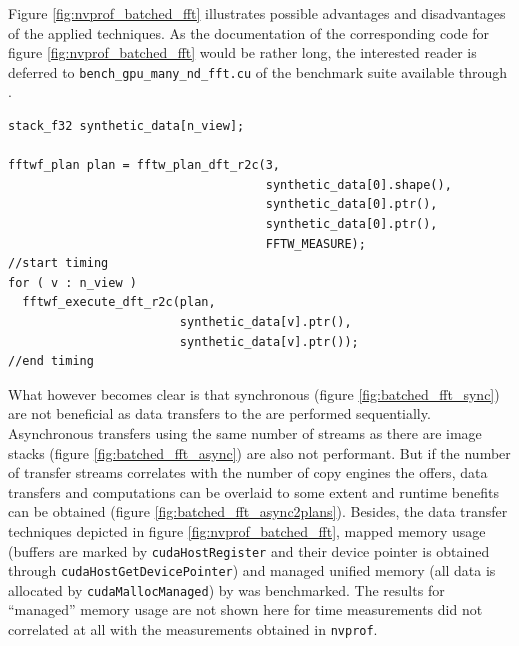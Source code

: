 Figure \ref{fig:nvprof_batched_fft} illustrates possible advantages and disadvantages of the applied techniques. As the documentation of the corresponding code for figure \ref{fig:nvprof_batched_fft} would be rather long, the interested reader is deferred to \texttt{bench\_gpu\_many\_nd\_fft.cu} of the \lmvn{} benchmark suite available through \cite{lmvn_repo}. 

\begin{lstlisting}[caption={Asynchronous Batched FFT on synthetic data performed on GPU in pseudo-code based on the \cufft{} syntax.},label={lst:batched_fft_gpu_async2plans}]
stack_f32 synthetic_data[n_view];

fftwf_plan plan = fftw_plan_dft_r2c(3,
                                    synthetic_data[0].shape(),
                                    synthetic_data[0].ptr(),
                                    synthetic_data[0].ptr(),
                                    FFTW_MEASURE);
//start timing
for ( v : n_view )
  fftwf_execute_dft_r2c(plan, 
                        synthetic_data[v].ptr(),
                        synthetic_data[v].ptr());
//end timing
\end{lstlisting}


What however becomes clear is that synchronous (figure \ref{fig:batched_fft_sync}) are not beneficial as data transfers to the \gpu{} are performed sequentially. Asynchronous transfers using the same number of streams as there are image stacks (figure \ref{fig:batched_fft_async}) are also not performant. But if the number of transfer streams correlates with the number of copy engines the \gpu{} offers, data transfers and computations can be overlaid to some extent and runtime benefits can be obtained (figure \ref{fig:batched_fft_async2plans}). Besides, the data transfer techniques depicted in figure \ref{fig:nvprof_batched_fft}, mapped memory usage (buffers are marked by \texttt{cudaHostRegister} and their device pointer is obtained through \texttt{cudaHostGetDevicePointer}) and managed unified memory (all data is allocated by \texttt{cudaMallocManaged}) by \cufft{}  was benchmarked. The results for ``managed'' memory usage are not shown here for time measurements did not correlated at all with the measurements obtained in \texttt{nvprof}. 

